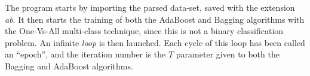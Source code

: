 The program starts by importing the parsed data-set, saved with the extension \textit{ab}. It then starts the training of both the AdaBoost and Bagging algorithms with the One-Vs-All multi-class technique, since this is not a binary classification problem. An infinite \textit{loop} is then launched. Each cycle of this loop has been called an ``epoch'', and the iteration number is the $T$ parameter given to both the Bagging and AdaBoost algorithms.
